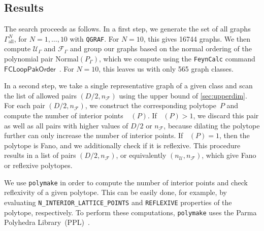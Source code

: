 \documentclass[12pt,a4paper]{article}
\theoremstyle{plain}
\theoremstyle{remark}
\newcommand{\nprops}{N}
\DeclareMathOperator{\nint}{N_{\mathrm{int}}}
\newcommand{\cU}{\mathscr {U}}
\newcommand{\cF}{\mathscr {F}}
\begin{document}
%		
 \subsection{Results}
 
The search proceeds as follows. In a first step, we generate the set of all graphs $\Gamma^\nprops_{\mathrm{all}}$, for $\nprops=1, \dots, 10$ with \texttt{QGRAF}. 
For $N=10$, this gives 16744 graphs. 
We then compute $\cU_\Gamma$ and $\cF_\Gamma$ and group our graphs based on the normal ordering of the polynomial pair $\text{Normal}(P_\Gamma)$, which we compute using the \texttt{FeynCalc} command $\mathsf{FCLoopPakOrder}$~\cite{Shtabovenko:2023idz}.
For $N=10$, this leaves us with only 565 graph classes.

In a second step, we take a single representative graph of a given class and scan the list of allowed pairs $(D/2, n_\cF)$ using the upper bound of \cref{sec:upperdim}.
For each pair $(D/2, n_\cF)$, we construct the corresponding polytope~$P$ and compute the number of interior points~$\nint(P)$.
If $\nint(P) > 1$, we discard this pair as well as all pairs with higher values of $D/2$ or $n_\cF$, because dilating the polytope further can only increase the number of interior points.
If $\nint(P) = 1$, then the polytope is Fano, and we additionally check if it is reflexive.
This procedure results in a list of pairs $(D/2, n_\cF)$, or equivalently $(n_\cU, n_\cF)$, which give Fano or reflexive polytopes.    
 
We use \texttt{polymake} in order to compute the number of interior points and check reflexivity of a given polytope.
This can be easily done, for example, by evaluating \texttt{N\_INTERIOR\_LATTICE\_POINTS} and \texttt{REFLEXIVE} properties of the polytope, respectively.
To perform these computations, \texttt{polymake} uses the Parma Polyhedra Library~(PPL)~\cite{BagnaraHZ08SCP}.
\end{document}
